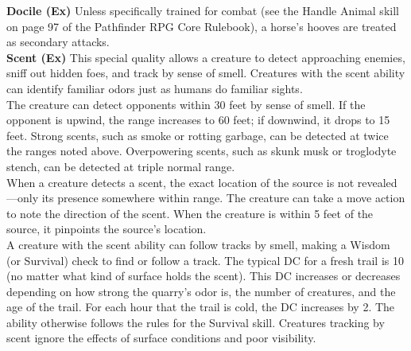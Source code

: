 \textbf{Docile (Ex)} Unless specifically trained for combat (see the Handle Animal skill on page 97 of the Pathfinder RPG Core Rulebook), a horse’s hooves are treated as secondary attacks. \\

\textbf{Scent (Ex)} This special quality allows a creature to detect approaching enemies, sniff out hidden foes, and track by sense of smell. Creatures with the scent ability can identify familiar odors just as humans do familiar sights. \\

The creature can detect opponents within 30 feet by sense of smell. If the opponent is upwind, the range increases to 60 feet; if downwind, it drops to 15 feet. Strong scents, such as smoke or rotting garbage, can be detected at twice the ranges noted above. Overpowering scents, such as skunk musk or troglodyte stench, can be detected at triple normal range. \\

When a creature detects a scent, the exact location of the source is not revealed—only its presence somewhere within range. The creature can take a move action to note the direction of the scent. When the creature is within 5 feet of the source, it pinpoints the source's location. \\

A creature with the scent ability can follow tracks by smell, making a Wisdom (or Survival) check to find or follow a track. The typical DC for a fresh trail is 10 (no matter what kind of surface holds the scent). This DC increases or decreases depending on how strong the quarry's odor is, the number of creatures, and the age of the trail. For each hour that the trail is cold, the DC increases by 2. The ability otherwise follows the rules for the Survival skill. Creatures tracking by scent ignore the effects of surface conditions and poor visibility. \\

\newpage
